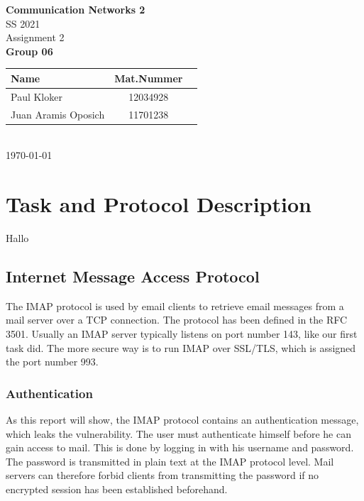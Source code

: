 \documentclass[parskip=full]{scrartcl}
\begin{document}
\begin{titlepage}
    \centering
    \vspace*{2cm}
    {\Huge \textbf{Communication Networks 2}}\\
    SS 2021\\
    \vspace*{1cm}
    {\Large Assignment 2}
    \\\vspace*{3cm}
    {\Large \textbf{Group 06}}\\
    \vspace*{1cm}
    {\large 
        \begin{tabular}{l c c}
            Name & Mat.Nummer \\ \hline
            Paul Kloker & 12034928 \\
            Juan Aramis Oposich & 11701238
        \end{tabular}
    }
    \\\vspace*{7cm}
    \today
\end{titlepage}

\section{Task and Protocol Description} \label{sec:task}

Hallo

\subsection{Internet Message Access Protocol}
The IMAP protocol is used by email clients to retrieve email messages from a mail server over a TCP connection. The protocol has been defined in the RFC 3501. Usually an IMAP server typically listens on port number 143, like our first task did. The more secure way is to run IMAP over SSL/TLS, which is assigned the port number 993.

\subsubsection{Authentication}
As this report will show, the IMAP protocol contains an authentication message, which leaks the vulnerability. The user must authenticate himself before he can gain access to mail. This is done by logging in with his username and password. The password is transmitted in plain text at the IMAP protocol level. Mail servers can therefore forbid clients from transmitting the password if no encrypted session has been established beforehand.\\
\end{document}
